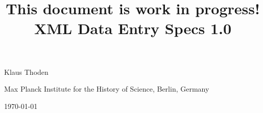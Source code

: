 \documentclass[fontsize=11pt, paper=a4, 
twoside, %
DIV15,
headings=normal,
parskip=half-, 
numbers=noenddot]{scrartcl}
\begin{document}
\title{This document is work in progress!\\
XML Data Entry Specs 1.0}
\date{}
\author{}
\maketitle
\vspace{-20mm}

\begin{center}
\large Klaus Thoden

\normalsize Max Planck Institute for the History of Science, Berlin, Germany

\today
\end{center}

\tableofcontents
\newpage



\end{document}
